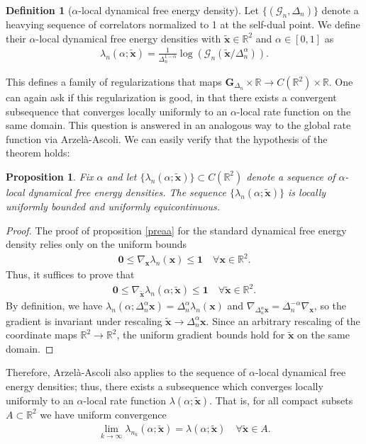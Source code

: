 \documentclass[a4paper,11pt]{article}
\theoremstyle{plain}
\newtheorem{prop}[thm]{Proposition}
\theoremstyle{definition}
\newtheorem{defn}{Definition}[section]
\theoremstyle{remark}
\newcommand{\bs}[1]{\boldsymbol{#1}}
\newcommand{\ba}{\begin{equation} \begin{aligned}}
\newcommand{\ea}{\end{aligned} \end{equation}}
\newcommand{\De}{\Delta}
\begin{document}
\begin{defn}[$\alpha$-local dynamical free energy density]
\label{localratefuncdef}
Let $\{(\mathcal{G}_n,\De_n)\}$ denote a heavying sequence of correlators normalized to 1 at the self-dual point. We define their $\alpha$-local dynamical free energy densities with $\tilde{\bs{x}}\in\mathbb{R}^2$ and $\alpha \in [0,1]$ as
\ba
\lambda_n(\alpha;\tilde{\bs{x}}) = \frac{1}{\De_n^{1-\alpha}} \log\left(  \mathcal{G}_n(\tilde{\bs{x}}/\De_n^{\alpha}) \right).
\ea
\end{defn}
\noindent This defines a family of regularizations that maps $\mathbf{G}_{\De_n}\times\mathbb{R} \to C(\mathbb{R}^2)\times\mathbb{R}$. One can again ask if this regularization is good, in that there exists a convergent subsequence that converges locally uniformly to an $\alpha$-local rate function on the same domain. This question is answered in an analogous way to the global rate function via Arzel\`a-Ascoli. We can easily verify that the hypothesis of the theorem holds:
\begin{prop}
\label{preaa2}
Fix $\alpha$ and let $\{\lambda_n(\alpha;\tilde{\bs{x}})\} \subset C(\mathbb{R}^2)$ denote a sequence of $\alpha$-local dynamical free energy densities. The sequence $\{\lambda_n(\alpha;\tilde{\bs{x}})\}$ is locally uniformly bounded and uniformly equicontinuous. 
\end{prop}
\begin{proof}
The proof of proposition \ref{preaa} for the standard dynamical free energy density relies only on the uniform bounds
\ba
\bs{0} \leq \nabla_{\bs{x}} \lambda_n(\bs{x}) \leq \bs{1} \quad \forall \bs{x} \in \mathbb{R}^2.
\ea
Thus, it suffices to prove that
\ba
\label{localgradbound}
\bs{0} \leq \nabla_{\tilde{\bs{x}}} \lambda_n(\alpha;\tilde{\bs{x}}) \leq \bs{1} \quad \forall \tilde{\bs{x}} \in \mathbb{R}^2.
\ea
By definition, we have $\lambda_n(\alpha; \De_n^\alpha\bs{x}) = \De_n^{\alpha} \lambda_n(\bs{x})$ and $\nabla_{\De_n^\alpha\bs{x}} = \De_n^{-\alpha} \nabla_{\bs{x}}$, so the gradient is invariant under rescaling $\tilde{\bs{x}} \to \De_n^\alpha \bs{x}$. Since an arbitrary rescaling of the coordinate maps $\mathbb{R}^2 \to \mathbb{R}^2$, the uniform gradient bounds hold for $\tilde{\bs{x}}$ on the same domain.
\end{proof}
Therefore, Arzel\`a-Ascoli also applies to the sequence of $\alpha$-local dynamical free energy densities; thus, there exists a subsequence which converges locally uniformly to an $\alpha$-local rate function $\lambda(\alpha;\tilde{\bs{x}})$. That is, for all compact subsets $A \subset \mathbb{R}^2$ we have uniform convergence
\ba
\lim_{k\to\infty}\lambda_{n_k}(\alpha;\tilde{\bs{x}}) = \lambda(\alpha;\tilde{\bs{x}}) \quad \forall \tilde{\bs{x}} \in A.
\ea
\end{document}
